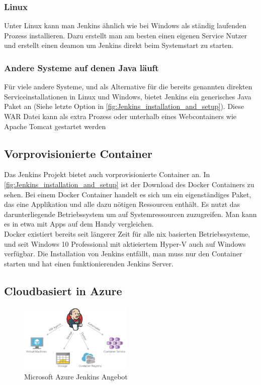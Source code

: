 \subsubsection*{Linux}
Unter Linux kann man Jenkins ähnlich wie bei Windows als ständig laufenden Prozess installieren. Dazu erstellt man am besten einen eigenen Service Nutzer  und erstellt einen deamon um Jenkins direkt beim Systemstart zu starten. \cite{jenkins-installing}
\subsubsection*{Andere Systeme auf denen Java läuft}
Für viele andere Systeme, und als Alternative für die bereits genannten direkten Serviceinstallationen in Linux und Windows, bietet Jenkins ein generisches Java Paket an (Siehe letzte Option in \autoref{fig:Jenkins_installation_and_setup}). Diese WAR Datei kann als extra Prozess oder unterhalb eines Webcontainers wie Apache Tomcat gestartet werden \cite{jenkins-installing}
\subsection{Vorprovisionierte Container}
Das Jenkins Projekt bietet auch vorprovisionierte Container an. In \autoref{fig:Jenkins_installation_and_setup} ist der Download des Docker Containers zu sehen. Bei einem Docker Container handelt es sich um ein eigenständiges Paket, das eine Applikation und alle dazu nötigen Ressourcen enthält. Es nutzt das darunterliegende Betriebssystem um auf Systemressourcen zuzugreifen. Man kann es in etwa mit Apps auf dem Handy vergleichen.\\
Docker existiert bereits seit längerer Zeit für alle \*nix basierten Betriebssysteme, und seit Windows 10 Professional mit aktieiertem Hyper-V auch auf Windows verfügbar. Die Installation von Jenkins entfällt, man muss nur den Container starten und hat einen funktionierenden Jenkins Server.
\subsection{Cloudbasiert in Azure}
\begin{figure}
  \begin{center}
    \includegraphics[width=0.48\textwidth]{./Images/Screenshot1.png}
  \end{center}
  \caption{Microsoft Azure Jenkins Angebot\cite{jenkins-azure}}\label{fig:Screenshot1}
\end{figure}

